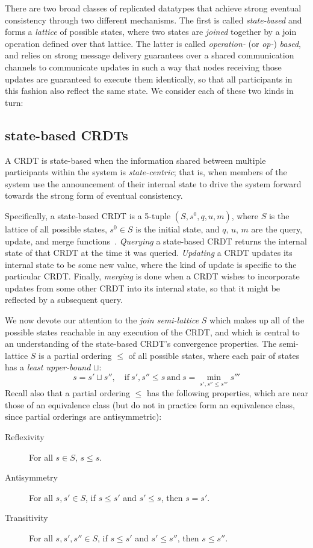 There are two broad classes of replicated datatypes that achieve strong eventual
consistency through two different mechanisms. The first is called
\textit{state-based} and forms a \textit{lattice} of possible states, where two
states are \textit{joined} together by a join operation defined over that
lattice. The latter is called \textit{operation-} (or \textit{op-})
\textit{based}, and relies on strong message delivery guarantees over a shared
communication channels to communicate updates in such a way that nodes receiving
those updates are guaranteed to execute them identically, so that all
participants in this fashion also reflect the same state. We consider each of
these two kinds in turn:

\subsection{state-based CRDTs}
A CRDT is state-based when the information shared between multiple participants
within the system is \textit{state-centric}; that is, when members of the system
use the announcement of their internal state to drive the system forward towards
the strong form of eventual consistency.

Specifically, a state-based CRDT is a 5-tuple $(S, s^0, q, u, m)$, where $S$ is
the lattice of all possible states, $s^0 \in S$ is the initial state, and $q$,
$u$, $m$ are the query, update, and merge functions~\citep{shapiro11}.
\textit{Querying} a state-based CRDT returns the internal state of that CRDT at
the time it was queried. \textit{Updating} a CRDT updates its internal state to
be some new value, where the kind of update is specific to the particular CRDT.
Finally, \textit{merging} is done when a CRDT wishes to incorporate updates from
some other CRDT into its internal state, so that it might be reflected by a
subsequent query.

We now devote our attention to the \textit{join semi-lattice} $S$ which makes up
all of the possible states reachable in any execution of the CRDT, and which is
central to an understanding of the state-based CRDT's convergence properties.
The semi-lattice $S$ is a partial ordering $\leq$ of all possible states, where
each pair of states has a \textit{least upper-bound} $\sqcup$:
\[
  s = s' \sqcup s'',\quad \mathrm{if}~
    s', s'' \leq s~\mathrm{and}~
    s = \min_{s', s'' \leq s'''} s'''
\]
Recall also that a partial ordering $\leq$ has the following properties, which
are near those of an equivalence class (but do not in practice form an
equivalence class, since partial orderings are antisymmetric):
\begin{description}
  \item[Reflexivity] For all $s \in S$, $s \leq s$.
  \item[Antisymmetry] For all $s, s' \in S$, if $s \leq s'$ and $s' \leq s$,
    then $s = s'$.
  \item[Transitivity] For all $s, s', s'' \in S$, if $s \leq s'$ and $s' \leq
    s''$, then $s \leq s''$.
\end{description}

